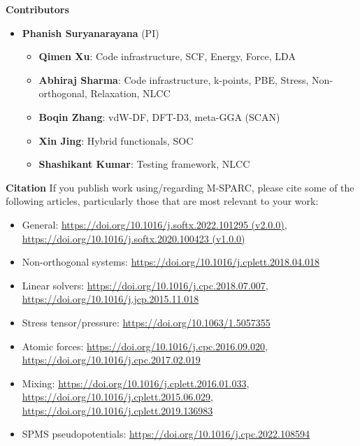 \documentclass[xcolor=dvipsnames,t]{beamer}
\begin{document}
\begin{frame}[allowframebreaks]{\textbf{Contributors}} \label{Contributors}

  \begin{itemize}
  \item \textbf{Phanish Suryanarayana} (PI)
  \begin{itemize}
  \item \textbf{Qimen Xu}: Code infrastructure, SCF, Energy, Force, LDA \\  
  \item \textbf{Abhiraj Sharma}: Code infrastructure, k-points, PBE, Stress, Non-orthogonal, Relaxation, NLCC \\   
  \item \textbf{Boqin Zhang}: vdW-DF, DFT-D3, meta-GGA (SCAN) \\  
  \item \textbf{Xin Jing}: Hybrid functionals, SOC \\  
  \item \textbf{Shashikant Kumar}: Testing framework, NLCC \\  
  \end{itemize}
  \end{itemize}


  
\end{frame}


\begin{frame}[allowframebreaks]{\textbf{Citation}} \label{Citation}
If you publish work using/regarding M-SPARC, please cite some of the following articles, particularly those that are most relevant to your work:
\begin{itemize}
    \item General: \url{https://doi.org/10.1016/j.softx.2022.101295 (v2.0.0)}, \url{https://doi.org/10.1016/j.softx.2020.100423 (v1.0.0)}
    \item Non-orthogonal systems: \url{https://doi.org/10.1016/j.cplett.2018.04.018}
    \item Linear solvers: \url{https://doi.org/10.1016/j.cpc.2018.07.007},    \url{https://doi.org/10.1016/j.jcp.2015.11.018}
    \item Stress tensor/pressure: \url{https://doi.org/10.1063/1.5057355}
    \item Atomic forces: \url{https://doi.org/10.1016/j.cpc.2016.09.020}, \url{https://doi.org/10.1016/j.cpc.2017.02.019}
    \item Mixing: \url{https://doi.org/10.1016/j.cplett.2016.01.033}, \url{https://doi.org/10.1016/j.cplett.2015.06.029}, \url{https://doi.org/10.1016/j.cplett.2019.136983}
    \item SPMS pseudopotentials: \url{https://doi.org/10.1016/j.cpc.2022.108594}
\end{itemize}
\end{frame}
\end{document}
